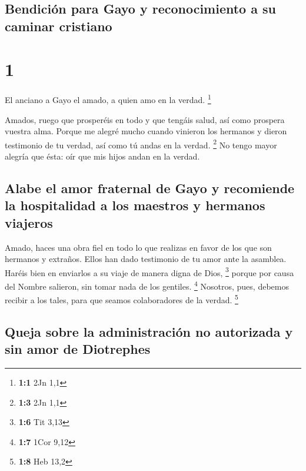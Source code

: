 \hypertarget{bendiciuxf3n-para-gayo-y-reconocimiento-a-su-caminar-cristiano}{%
\subsection{Bendición para Gayo y reconocimiento a su caminar
cristiano}\label{bendiciuxf3n-para-gayo-y-reconocimiento-a-su-caminar-cristiano}}

\hypertarget{section}{%
\section{1}\label{section}}

 El anciano a Gayo el amado, a quien amo en la verdad.
\footnote{\textbf{1:1} 2Jn 1,1}

 Amados, ruego que prosperéis en todo y que tengáis salud,
así como prospera vuestra alma.  Porque me alegré mucho
cuando vinieron los hermanos y dieron testimonio de tu verdad, así como
tú andas en la verdad. \footnote{\textbf{1:3} 2Jn 1,1}  No
tengo mayor alegría que ésta: oír que mis hijos andan en la verdad.

\hypertarget{alabe-el-amor-fraternal-de-gayo-y-recomiende-la-hospitalidad-a-los-maestros-y-hermanos-viajeros}{%
\subsection{Alabe el amor fraternal de Gayo y recomiende la hospitalidad
a los maestros y hermanos
viajeros}\label{alabe-el-amor-fraternal-de-gayo-y-recomiende-la-hospitalidad-a-los-maestros-y-hermanos-viajeros}}

 Amado, haces una obra fiel en todo lo que realizas en
favor de los que son hermanos y extraños.  Ellos han dado
testimonio de tu amor ante la asamblea. Haréis bien en enviarlos a su
viaje de manera digna de Dios, \footnote{\textbf{1:6} Tit 3,13}
 porque por causa del Nombre salieron, sin tomar nada de
los gentiles. \footnote{\textbf{1:7} 1Cor 9,12}  Nosotros,
pues, debemos recibir a los tales, para que seamos colaboradores de la
verdad. \footnote{\textbf{1:8} Heb 13,2}

\hypertarget{queja-sobre-la-administraciuxf3n-no-autorizada-y-sin-amor-de-diotrephes}{%
\subsection{Queja sobre la administración no autorizada y sin amor de
Diotrephes}\label{queja-sobre-la-administraciuxf3n-no-autorizada-y-sin-amor-de-diotrephes}}

